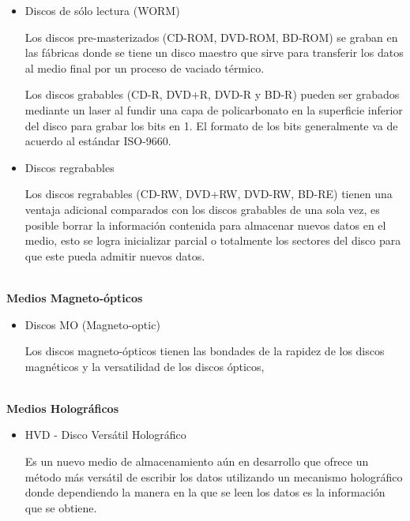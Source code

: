 \begin{itemize}
  \item Discos de s\'{o}lo lectura (WORM)
  
  Los discos pre-masterizados (CD-ROM, DVD-ROM, BD-ROM) se graban en las f\'{a}bricas donde se tiene un disco maestro que sirve para transferir los datos al medio final por un proceso de vaciado t\'{e}rmico.
  
  Los discos grabables (CD-R, DVD+R, DVD-R y BD-R) pueden ser grabados mediante un laser al fundir una capa de policarbonato en la superficie inferior del disco para grabar los bits en 1. El formato de los bits generalmente va de acuerdo al est\'{a}ndar ISO-9660.
  
  \item Discos regrabables
  
  Los discos regrabables (CD-RW, DVD+RW, DVD-RW, BD-RE) tienen una ventaja adicional comparados con los discos grabables de una sola vez, es posible borrar la informaci\'{o}n contenida para almacenar nuevos datos en el medio, esto se logra inicializar parcial o totalmente los sectores del disco para que este pueda admitir nuevos datos.
  
\end{itemize}

\textbf{\\ Medios Magneto-\'{o}pticos \\}

\begin{itemize}
  \item Discos MO (Magneto-optic)
  
  Los discos magneto-\'{o}pticos tienen las bondades de la rapidez de los discos magn\'{e}ticos y la versatilidad de los discos \'{o}pticos, 
  
\end{itemize}

\textbf{\\ Medios Hologr\'{a}ficos \\}

\begin{itemize}
  \item HVD - Disco Vers\'{a}til Hologr\'{a}fico
  
  Es un nuevo medio de almacenamiento a\'{u}n en desarrollo que ofrece un m\'{e}todo m\'{a}s vers\'{a}til de escribir los datos utilizando un mecanismo hologr\'{a}fico donde dependiendo la manera en la que se leen los datos es la informaci\'{o}n que se obtiene.
  
\end{itemize}
